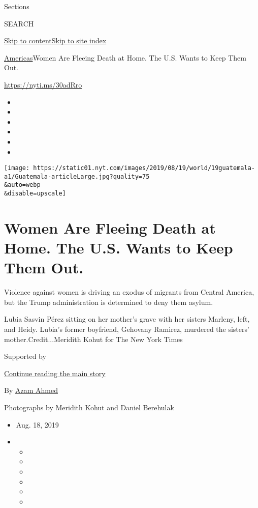 Sections

SEARCH

\protect\hyperlink{site-content}{Skip to
content}\protect\hyperlink{site-index}{Skip to site index}

\href{/section/world/americas}{Americas}\textbar{}Women Are Fleeing
Death at Home. The U.S. Wants to Keep Them Out.

\url{https://nyti.ms/30adRro}

\begin{itemize}
\item
\item
\item
\item
\item
\item
\end{itemize}

\texttt{[image: https://static01.nyt.com/images/2019/08/19/world/19guatemala-a1/Guatemala-articleLarge.jpg?quality=75\\\&auto=webp\\\&disable=upscale]}

\hypertarget{women-are-fleeing-death-at-home-the-us-wants-to-keep-them-out}{%
\section{Women Are Fleeing Death at Home. The U.S. Wants to Keep Them
Out.}\label{women-are-fleeing-death-at-home-the-us-wants-to-keep-them-out}}

Violence against women is driving an exodus of migrants from Central
America, but the Trump administration is determined to deny them asylum.

Lubia Sasvin Pérez sitting on her mother's grave with her sisters
Marleny, left, and Heidy. Lubia's former boyfriend, Gehovany Ramirez,
murdered the sisters' mother.Credit...Meridith Kohut for The New York
Times

Supported by

\protect\hyperlink{after-sponsor}{Continue reading the main story}

By \href{https://www.nytimes.com/by/azam-ahmed}{Azam Ahmed}

Photographs by Meridith Kohut and Daniel Berehulak

\begin{itemize}
\item
  Aug. 18, 2019
\item
  \begin{itemize}
  \item
  \item
  \item
  \item
  \item
  \item
  \end{itemize}
\end{itemize}

